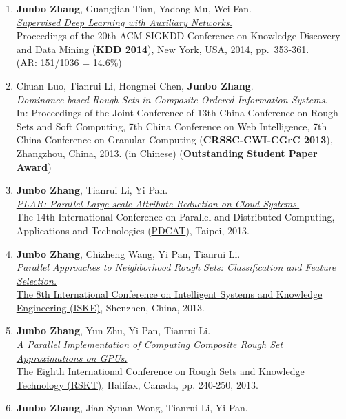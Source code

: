 \documentclass[]{article}
\begin{document}
\begin{enumerate}
\def\labelenumi{\arabic{enumi}.}
\item
  \textbf{Junbo Zhang}, Guangjian Tian, Yadong Mu, Wei Fan.\\
  \href{http://dx.doi.org/10.1145/2623330.2623618}{\emph{Supervised Deep
  Learning with Auxiliary Networks.}}\\ Proceedings of the 20th ACM
  SIGKDD Conference on Knowledge Discovery and Data Mining
  (\href{http://www.kdd.org/kdd2014/}{\textbf{KDD 2014}}), New York,
  USA, 2014, pp.~353-361.\\ (AR: 151/1036 = 14.6\%)
\item
  Chuan Luo, Tianrui Li, Hongmei Chen, \textbf{Junbo Zhang}.\\
  \emph{Dominance-based Rough Sets in Composite Ordered Information
  Systems}.\\ In: Proceedings of the Joint Conference of 13th China
  Conference on Rough Sets and Soft Computing, 7th China Conference on
  Web Intelligence, 7th China Conference on Granular Computing
  (\textbf{CRSSC-CWI-CGrC 2013}), Zhangzhou, China, 2013. (in Chinese)
  (\textbf{Outstanding Student Paper Award})
\item
  \textbf{Junbo Zhang}, Tianrui Li, Yi Pan.\\ \href{}{\emph{PLAR:
  Parallel Large-scale Attribute Reduction on Cloud Systems.}}\\ The
  14th International Conference on Parallel and Distributed Computing,
  Applications and Technologies
  (\href{http://pdcat13.csie.ntust.edu.tw/}{PDCAT}), Taipei, 2013.
\item
  \textbf{Junbo Zhang}, Chizheng Wang, Yi Pan, Tianrui Li.\\
  \href{}{\emph{Parallel Approaches to Neighborhood Rough Sets:
  Classification and Feature Selection.}}\\
  \href{http://kjb.szu.edu.cn/iske/}{The 8th International Conference on
  Intelligent Systems and Knowledge Engineering (ISKE)}, Shenzhen,
  China, 2013.
\item
  \textbf{Junbo Zhang}, Yun Zhu, Yi Pan, Tianrui Li.\\ \href{}{\emph{A
  Parallel Implementation of Computing Composite Rough Set
  Approximations on GPUs.}}\\ \href{http://cs.smu.ca/jrs2013/}{The
  Eighth International Conference on Rough Sets and Knowledge Technology
  (RSKT)}, Halifax, Canada, pp. 240-250, 2013.
\item
  \textbf{Junbo Zhang}, Jian-Syuan Wong, Tianrui Li, Yi Pan.\\

\end{enumerate}
\end{document}
